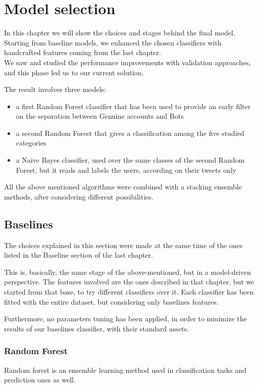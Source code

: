 \chapter{Model selection}
\label{capitolo5}
\thispagestyle{empty}

In this chapter we will show the choices and stages behind the final model.
Starting from baseline models, we enhanced the chosen classifiers with handcrafted features coming from the last chapter.\\
We saw and studied the performance improvements with validation approaches, and this phase led us to our current solution.

The result involves three models:
\begin{itemize}
	\item[\PencilRight] a first Random Forest classifier that has been used to provide an early filter on the separation between Genuine accounts and Bots
	\item[\PencilRight] a second Random Forest that gives a classification among the five studied categories
	\item[\PencilRight] a Naive Bayes classifier, used over the same classes of the second Random Forest, but it reads and labels the users, according on their tweets only
\end{itemize}
All the above mentioned algorithms were combined with a stacking ensemble methods, after considering different possibilities.

\section{Baselines}
The choices explained in this section were made at the same time of the ones listed in the Baseline section of the last chapter.

This is, basically, the same stage of the above-mentioned, but in a model-driven perspective.
The features involved are the ones described in that chapter, but we started from that base, to try different classifiers over it.
Each classifier has been fitted with the entire dataset, but considering only baselines features.

Furthermore, no parameters tuning has been applied, in order to minimize the results of our baselines classifier, with their standard assets.
\subsection{Random Forest}
Random forest is an ensemble learning method used in classification tasks and prediction ones as well.

